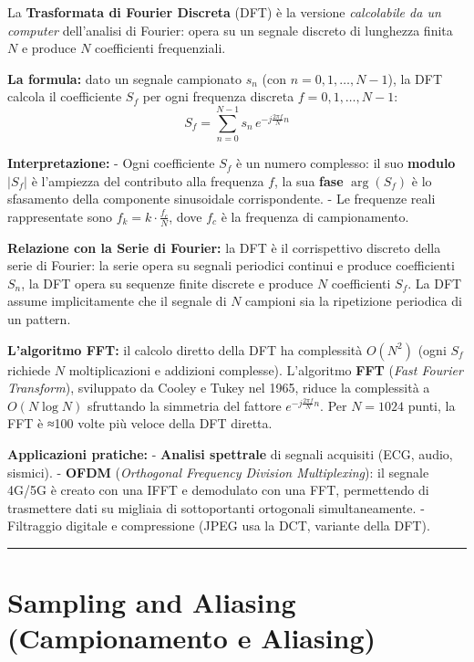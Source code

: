 \documentclass[
  italian,
  openany]{book}
\begin{document}
La \textbf{Trasformata di Fourier Discreta} (DFT) è la versione
\emph{calcolabile da un computer} dell'analisi di Fourier: opera su un
segnale discreto di lunghezza finita \(N\) e produce \(N\) coefficienti
frequenziali.

\textbf{La formula:} dato un segnale campionato \(s_n\) (con
\(n = 0, 1, \ldots, N-1\)), la DFT calcola il coefficiente \(S_f\) per
ogni frequenza discreta \(f = 0, 1, \ldots, N-1\):
\[S_f = \sum_{n=0}^{N-1} s_n \, e^{-j\frac{2\pi f}{N}n}\]

\textbf{Interpretazione:} - Ogni coefficiente \(S_f\) è un numero
complesso: il suo \textbf{modulo} \(|S_f|\) è l'ampiezza del contributo
alla frequenza \(f\), la sua \textbf{fase} \(\arg(S_f)\) è lo sfasamento
della componente sinusoidale corrispondente. - Le frequenze reali
rappresentate sono \(f_k = k \cdot \frac{f_c}{N}\), dove \(f_c\) è la
frequenza di campionamento.

\textbf{Relazione con la Serie di Fourier:} la DFT è il corrispettivo
discreto della serie di Fourier: la serie opera su segnali periodici
continui e produce coefficienti \(S_n\), la DFT opera su sequenze finite
discrete e produce \(N\) coefficienti \(S_f\). La DFT assume
implicitamente che il segnale di \(N\) campioni sia la ripetizione
periodica di un pattern.

\textbf{L'algoritmo FFT:} il calcolo diretto della DFT ha complessità
\(O(N^2)\) (ogni \(S_f\) richiede \(N\) moltiplicazioni e addizioni
complesse). L'algoritmo \textbf{FFT} (\emph{Fast Fourier Transform}),
sviluppato da Cooley e Tukey nel 1965, riduce la complessità a
\(O(N \log N)\) sfruttando la simmetria del fattore
\(e^{-j\frac{2\pi f}{N}n}\). Per \(N = 1024\) punti, la FFT è ≈100 volte
più veloce della DFT diretta.

\textbf{Applicazioni pratiche:} - \textbf{Analisi spettrale} di segnali
acquisiti (ECG, audio, sismici). - \textbf{OFDM} (\emph{Orthogonal
Frequency Division Multiplexing}): il segnale 4G/5G è creato con una
IFFT e demodulato con una FFT, permettendo di trasmettere dati su
migliaia di sottoportanti ortogonali simultaneamente. - Filtraggio
digitale e compressione (JPEG usa la DCT, variante della DFT).

\begin{center}\rule{0.5\linewidth}{0.5pt}\end{center}

\section{Sampling and Aliasing (Campionamento e
Aliasing)}\label{sampling-and-aliasing-campionamento-e-aliasing}
\end{document}
